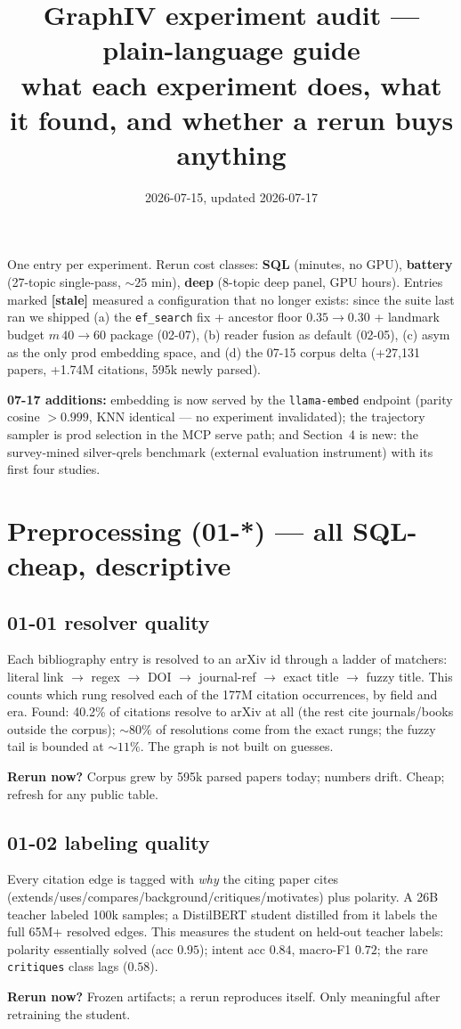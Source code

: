 \documentclass[10pt]{article}
\title{\textbf{GraphIV experiment audit} --- plain-language guide\\
\large what each experiment does, what it found, and whether a rerun buys anything}
\author{2026-07-15, updated 2026-07-17}
\date{}
\newcommand{\rerun}[1]{\par\smallskip\noindent\textbf{Rerun now?} #1}
\newcommand{\stale}{\textbf{[stale]} }
\begin{document}
\maketitle

\noindent One entry per experiment. Rerun cost classes: \textbf{SQL} (minutes, no GPU),
\textbf{battery} (27-topic single-pass, ${\sim}25$ min), \textbf{deep} (8-topic deep panel,
GPU hours). Entries marked \stale measured a configuration that no longer exists: since the
suite last ran we shipped (a) the \texttt{ef\_search} fix + ancestor floor $0.35{\to}0.30$ +
landmark budget $m\,40{\to}60$ package (02-07), (b) reader fusion as default (02-05), (c) asym
as the only prod embedding space, and (d) the 07-15 corpus delta (+27{,}131 papers, +1.74M
citations, 595k newly parsed).

\medskip\noindent\textbf{07-17 additions:} embedding is now served by the \texttt{llama-embed}
endpoint (parity cosine $>0.999$, KNN identical --- no experiment invalidated); the trajectory
sampler is prod selection in the MCP serve path; and Section~4 is new: the survey-mined
silver-qrels benchmark (external evaluation instrument) with its first four studies.

\section{Preprocessing (01-*) --- all SQL-cheap, descriptive}

\subsection*{01-01 resolver quality}
Each bibliography entry is resolved to an arXiv id through a ladder of matchers: literal link
$\to$ regex $\to$ DOI $\to$ journal-ref $\to$ exact title $\to$ fuzzy title. This counts which
rung resolved each of the 177M citation occurrences, by field and era. Found: 40.2\% of
citations resolve to arXiv at all (the rest cite journals/books outside the corpus); ${\sim}80\%$
of resolutions come from the exact rungs; the fuzzy tail is bounded at ${\sim}11\%$. The graph
is not built on guesses.
\rerun{Corpus grew by 595k parsed papers today; numbers drift. Cheap; refresh for any public table.}

\subsection*{01-02 labeling quality}
Every citation edge is tagged with \emph{why} the citing paper cites
(extends/uses/compares/background/critiques/motivates) plus polarity. A 26B teacher labeled
100k samples; a DistilBERT student distilled from it labels the full 65M+ resolved edges. This
measures the student on held-out teacher labels: polarity essentially solved (acc $0.95$);
intent acc $0.84$, macro-F1 $0.72$; the rare \texttt{critiques} class lags ($0.58$).
\rerun{Frozen artifacts; a rerun reproduces itself. Only meaningful after retraining the student.}
\end{document}
